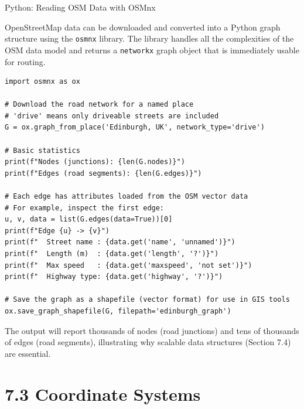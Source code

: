 \documentclass[aspectratio=169,10pt]{beamer}
\begin{document}
\begin{frame}[fragile]{Python: Reading OSM Data with OSMnx}

  OpenStreetMap data can be downloaded and converted into a Python
  graph structure using the \texttt{osmnx} library.  The library
  handles all the complexities of the OSM data model and returns a
  \texttt{networkx} graph object that is immediately usable for
  routing.

\begin{lstlisting}[caption={Downloading and inspecting an OSM road network}]
import osmnx as ox

# Download the road network for a named place
# 'drive' means only driveable streets are included
G = ox.graph_from_place('Edinburgh, UK', network_type='drive')

# Basic statistics
print(f"Nodes (junctions): {len(G.nodes)}")
print(f"Edges (road segments): {len(G.edges)}")

# Each edge has attributes loaded from the OSM vector data
# For example, inspect the first edge:
u, v, data = list(G.edges(data=True))[0]
print(f"Edge {u} -> {v}")
print(f"  Street name : {data.get('name', 'unnamed')}")
print(f"  Length (m)  : {data.get('length', '?')}")
print(f"  Max speed   : {data.get('maxspeed', 'not set')}")
print(f"  Highway type: {data.get('highway', '?')}")

# Save the graph as a shapefile (vector format) for use in GIS tools
ox.save_graph_shapefile(G, filepath='edinburgh_graph')
\end{lstlisting}

  The output will report thousands of nodes (road junctions) and
  tens of thousands of edges (road segments), illustrating why
  scalable data structures (Section 7.4) are essential.

\end{frame}

\section{7.3 Coordinate Systems}
\end{document}
